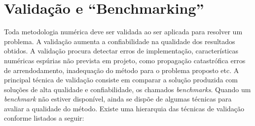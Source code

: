 \construirSec


\section{Validação e ``Benchmarking''} %
Toda metodologia numérica deve ser validada ao ser aplicada para resolver um problema. A validação aumenta a confiabilidade na qualidade dos resultados obtidos. A validação procura detectar erros de implementação, características numéricas espúrias não prevista em projeto, como propagação catastrófica erros de arrendodamento, inadequação do método para o problema proposto etc.  A principal técnica de validação consiste em comparar a solução produzida com soluções de alta qualidade e confiabilidade, os chamados {\it benchmarks}. Quando um {\it benchmark} não estiver disponível, ainda se dispõe de algumas técnicas para avaliar a qualidade do método. Existe uma hierarquia das técnicas de  validação conforme listados a seguir:
